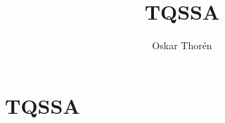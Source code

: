\documentclass[12pt]{report}
\begin{document}


\title{TQSSA}
\author{Oskar Thor\'{e}n}

\maketitle

\chapter{TQSSA}



\end{document}
